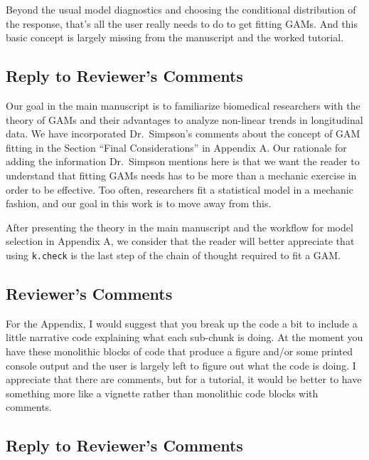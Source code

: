 \documentclass[
]{article}
\newcommand{\passthrough}[1]{#1}
\begin{document}
Beyond the usual model diagnostics and choosing the conditional distribution of the response, that's all the user really needs to do to get fitting GAMs. And this basic concept is largely missing from the manuscript and the worked tutorial.

\hypertarget{section-13}{%
\subsection{\texorpdfstring{\textcolor{reviewersblue} {Reply to Reviewer's Comments}}{}}\label{section-13}}

Our goal in the main manuscript is to familiarize biomedical researchers with the theory of GAMs and their advantages to analyze non-linear trends in longitudinal data. We have incorporated Dr.~Simpson's comments about the concept of GAM fitting in the Section ``Final Considerations'' in Appendix A. Our rationale for adding the information Dr.~Simpson mentions here is that we want the reader to understand that fitting GAMs needs has to be more than a mechanic exercise in order to be effective. Too often, researchers fit a statistical model in a mechanic fashion, and our goal in this work is to move away from this.

After presenting the theory in the main manuscript and the workflow for model selection in Appendix A, we consider that the reader will better appreciate that using \passthrough{\lstinline!k.check!} is the last step of the chain of thought required to fit a GAM.

\hypertarget{reviewers-comments-13}{%
\subsection{Reviewer's Comments}\label{reviewers-comments-13}}

For the Appendix, I would suggest that you break up the code a bit to include a little narrative code explaining what each sub-chunk is doing. At the moment you have these monolithic blocks of code that produce a figure and/or some
printed console output and the user is largely left to figure out what the code is doing. I appreciate that there are comments, but for a tutorial, it would be better to have something more like a vignette rather than monolithic code
blocks with comments.

\hypertarget{section-14}{%
\subsection{\texorpdfstring{\textcolor{reviewersblue} {Reply to Reviewer's Comments}}{}}\label{section-14}}
\end{document}
